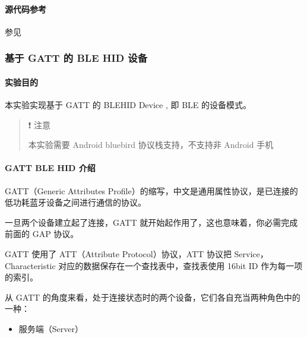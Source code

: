 \documentclass[a4paper,12pt,english]{sphinxmanual}
\begin{document}
{{\paragraph{源代码参考}
\label{\detokenize{exp-esp32/bluetooth/hid-gap:id6}}
\sphinxAtStartPar
参见{\hyperref[\detokenize{reference::doc}]{}}

\sphinxstepscope


\subsubsection{基于 GATT 的 BLE HID 设备}
\label{\detokenize{exp-esp32/bluetooth/hid-device-gatt:gatt-ble-hid}}\label{\detokenize{exp-esp32/bluetooth/hid-device-gatt::doc}}

\paragraph{实验目的}
\label{\detokenize{exp-esp32/bluetooth/hid-device-gatt:id1}}
\sphinxAtStartPar
本实验实现基于 GATT 的 BLEHID Device , 即 BLE 的设备模式。
\begin{quote}

\sphinxAtStartPar
❗ 注意

\sphinxAtStartPar
本实验需要 Android bluebird 协议栈支持，不支持非 Android 手机
\end{quote}


\paragraph{GATT BLE HID 介绍}
\label{\detokenize{exp-esp32/bluetooth/hid-device-gatt:id2}}
\sphinxAtStartPar
GATT（Generic Attributes Profile）的缩写，中文是通用属性协议，是已连接的低功耗蓝牙设备之间进行通信的协议。

\sphinxAtStartPar
一旦两个设备建立起了连接，GATT 就开始起作用了，这也意味着，你必需完成前面的 GAP 协议。

\sphinxAtStartPar
GATT 使用了 ATT（Attribute Protocol）协议，ATT 协议把 Service，Characteristic 对应的数据保存在一个查找表中，查找表使用 16bit ID 作为每一项的索引。

\sphinxAtStartPar
从 GATT 的角度来看，处于连接状态时的两个设备，它们各自充当两种角色中的一种：
\begin{itemize}
\item {} 
\sphinxAtStartPar
服务端（Server）

\end{itemize}

}}
\end{document}
